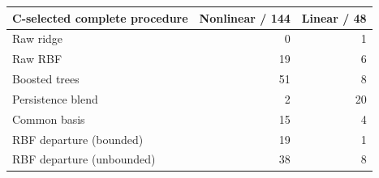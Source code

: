 \begin{tabular}{@{}lrr@{}}
\toprule
C-selected complete procedure & Nonlinear / 144 & Linear / 48 \\
\midrule
Raw ridge & 0 & 1 \\
Raw RBF & 19 & 6 \\
Boosted trees & 51 & 8 \\
Persistence blend & 2 & 20 \\
Common basis & 15 & 4 \\
RBF departure (bounded) & 19 & 1 \\
RBF departure (unbounded) & 38 & 8 \\
\bottomrule
\end{tabular}
